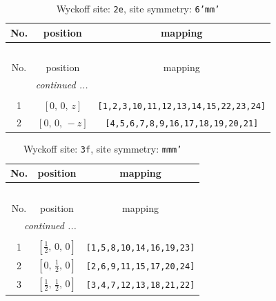 \documentclass[fleqn,8pt]{jsarticle}
\begin{document}
\begin{longtable}{ccc}
\caption{Wyckoff site: {\tt 2e}, site symmetry: {\tt 6'mm'}}
 \\
 \hline \hline
No. & position & mapping \\ \hline \endfirsthead

\multicolumn{2}{l}{\tablename\ \thetable{}} \\
 \hline \hline
No. & position & mapping \\ \hline \endhead

 \hline \hline
\multicolumn{2}{r}{\footnotesize\it continued ...} \\ \endfoot

 \hline \hline
\multicolumn{2}{r}{} \\ \endlastfoot

1 & $\left[ 0,\, 0,\, z \right]$ & {\tt [1,2,3,10,11,12,13,14,15,22,23,24]} \\ \hline
2 & $\left[ 0,\, 0,\, - z \right]$ & {\tt [4,5,6,7,8,9,16,17,18,19,20,21]} \\
\end{longtable}
\renewcommand{\arraystretch}{1.2}
\begin{longtable}{ccc}
\caption{Wyckoff site: {\tt 3f}, site symmetry: {\tt mmm'}}
 \\
 \hline \hline
No. & position & mapping \\ \hline \endfirsthead

\multicolumn{2}{l}{\tablename\ \thetable{}} \\
 \hline \hline
No. & position & mapping \\ \hline \endhead

 \hline \hline
\multicolumn{2}{r}{\footnotesize\it continued ...} \\ \endfoot

 \hline \hline
\multicolumn{2}{r}{} \\ \endlastfoot

1 & $\left[ \frac{1}{2},\, 0,\, 0 \right]$ & {\tt [1,5,8,10,14,16,19,23]} \\ \hline
2 & $\left[ 0,\, \frac{1}{2},\, 0 \right]$ & {\tt [2,6,9,11,15,17,20,24]} \\ \hline
3 & $\left[ \frac{1}{2},\, \frac{1}{2},\, 0 \right]$ & {\tt [3,4,7,12,13,18,21,22]} \\
\end{longtable}
\renewcommand{\arraystretch}{1.2}
\end{document}
